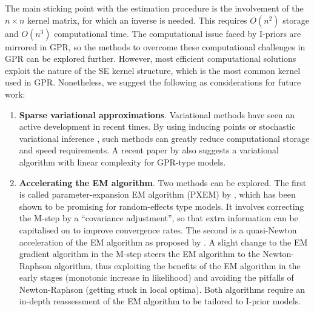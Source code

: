 \documentclass[showframe,11pt,twoside,openright]{report}
\begin{document}
The main sticking point with the estimation procedure is the involvement of the $n\times n$ kernel matrix, for which an inverse is needed.
This requires $O(n^2)$ storage and $O(n^3)$ computational time.
The computational issue faced by I-priors are mirrored in GPR, so the methods to overcome these computational challenges in GPR can be explored further.
However, most efficient computational solutions exploit the nature of the SE kernel structure, which is the most common kernel used in GPR.
Nonetheless, we suggest the following as considerations for future work:
\begin{enumerate}
  \item \textbf{Sparse variational approximations}.  Variational methods have seen an active development in recent times. By using inducing points \citep{titsias2009variational} or stochastic variational inference \citep{hensman2013gaussian}, such methods can greatly reduce computational storage and speed requirements. A recent paper by \citet{cheng2017variational} also suggests a variational algorithm with linear complexity for GPR-type models.
  \item \textbf{Accelerating the EM algorithm}.  Two methods can be explored. The first is called parameter-expansion EM algorithm (PXEM) by \citet{liu1998parameter}, which has been shown to be promising for random-effects type models. It involves correcting the M-step by a ``covariance adjustment'', so that extra information can be capitalised on to improve convergence rates. The second is a quasi-Newton acceleration of the EM algorithm as proposed by \citet{lange1995quasi}. A slight change to the EM gradient algorithm in the M-step steers the EM algorithm to the Newton-Raphson algorithm, thus exploiting the benefits of the EM algorithm in the early stages (monotonic increase in likelihood) and avoiding the pitfalls of Newton-Raphson (getting stuck in local optima). Both algorithms require an in-depth reassessment of the EM algorithm to be tailored to I-prior models.
\end{enumerate}

\hClosingStuffStandalone
\end{document}
